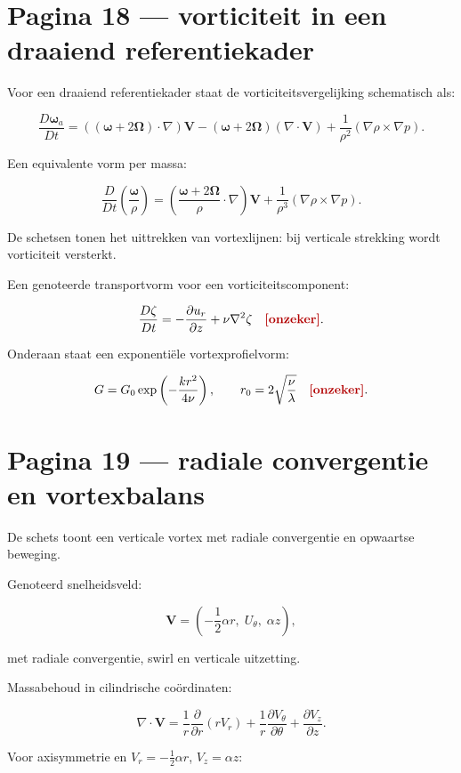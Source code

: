 \documentclass[11pt,a4paper]{article}
\newcommand{\onzeker}[1]{\ifmmode\text{\color{red!70!black}\bfseries[onzeker]}\else\textcolor{red!70!black}{\textbf{[onzeker:} #1\textbf{]}}\fi}
\newcommand{\vect}[1]{\mathbf{#1}}
\begin{document}
\newpage

\section*{Pagina 18 --- vorticiteit in een draaiend referentiekader}
Voor een draaiend referentiekader staat de vorticiteitsvergelijking schematisch als:

$$
\frac{D\bm{\omega}_a}{Dt}
=
\left((\bm{\omega}+2\bm{\Omega})\cdot\nabla\right)\vect{V}
-
(\bm{\omega}+2\bm{\Omega})(\nabla\cdot\vect{V})
+
\frac{1}{\rho^2}
(\nabla\rho\times\nabla p).
$$

Een equivalente vorm per massa:

$$
\frac{D}{Dt}
\left(
\frac{\bm{\omega}}{\rho}
\right)
=
\left(
\frac{\bm{\omega}+2\bm{\Omega}}{\rho}
\cdot\nabla
\right)\vect{V}
+
\frac{1}{\rho^3}
(\nabla\rho\times\nabla p).
$$

De schetsen tonen het uittrekken van vortexlijnen: bij verticale strekking wordt vorticiteit versterkt.

Een genoteerde transportvorm voor een vorticiteitscomponent:

$$
\frac{D\zeta}{Dt}
=
-\frac{\partial u_r}{\partial z}
+
\nu\nabla^2\zeta
\quad
\onzeker{\text{componentnotatie onzeker}}.
$$

Onderaan staat een exponentiële vortexprofielvorm:

$$
G
=
G_0\exp\left(-\frac{k r^2}{4\nu}\right),
\qquad
r_0
=
2\sqrt{\frac{\nu}{\lambda}}
\quad
\onzeker{\text{parameters uit notitie}}.
$$

\newpage

\section*{Pagina 19 --- radiale convergentie en vortexbalans}
De schets toont een verticale vortex met radiale convergentie en opwaartse beweging.

Genoteerd snelheidsveld:

$$
\vect{V}
=
\left(
-\frac{1}{2}\alpha r,\;
U_\theta,\;
\alpha z
\right),
$$

met radiale convergentie, swirl en verticale uitzetting.

Massabehoud in cilindrische coördinaten:

$$
\nabla\cdot\vect{V}
=
\frac{1}{r}\frac{\partial}{\partial r}(rV_r)
+
\frac{1}{r}\frac{\partial V_\theta}{\partial\theta}
+
\frac{\partial V_z}{\partial z}.
$$

Voor axisymmetrie en $V_r=-\frac{1}{2}\alpha r$, $V_z=\alpha z$:
\end{document}
